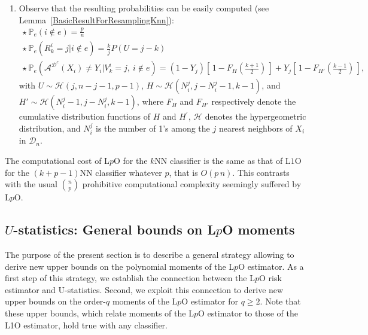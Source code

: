 \documentclass[twoside,11pt]{article}
\numberwithin{equation}{section}
\newcommand{\gp}[1]{\left(#1\right)}
\newcommand{\1}{\mathds{1}}%
\newcommand{\paren}[1]{\left( #1 \right)}
\newcommand{\croch}[1]{\left[\, #1 \,\right]}
\renewcommand{\P}{\mathbb{P}}
\newcommand{\D}{\mathcal{D}}
\newcommand{\De}{\mathcal{D}^e}
\newcommand{\A}{\mathcal{A}}
\numberwithin{equation}{section}
\theoremstyle{plain}
\begin{document}
\begin{enumerate}
\item Observe that the resulting probabilities can be easily computed (see Lemma~\ref{BasicResultForResamplingKnn}):
\begin{equation*}
\begin{array}{l}
\star \ \P_e(i \notin e) = \frac{p}{n}\\
\star \ \P_e(R_k^i=j| i \notin e) = \frac{k}{j}P\left(U=j-k\right)   \\
\star \ \P_e(\A^{\De}\gp{X_i} \neq Y_i| V_k^i=j, \ i \notin e) =
(1-Y_j) \croch{1-F_H\left(\frac{k+1}{2}\right) } +
Y_j \croch{ 1-F_{H'}\paren{ \frac{k-1}{2} } } ,
\end{array}
\end{equation*}
with $U \sim  \mathcal{H}(j,n-j-1,p-1)$, $H \sim \mathcal{H}(N_i^j,j-N_i^j-1,k-1)$, and $H' \sim \mathcal{H}(N_i^j-1,j-N_i^j,k-1)$,  {where $F_H$ and $F_{H'}$ respectively denote the cumulative distribution functions of $H$ and $H^\prime$, $\mathcal{H}$ denotes the hypergeometric distribution, and $N_i^j$ is the number of 1's among the $j$ nearest neighbors of $X_i$ in $\D_n$}.
%
\end{enumerate}
%
The computational cost of L$p$O for the $k$NN classifier is the same as that of L$1$O for the $(k+p-1)$NN classifier whatever $p$, that is $O(p\, n)$.
This contrasts with the usual ${n\choose p}$ prohibitive computational complexity seemingly suffered by L$p$O.



\subsection{$U$-statistics: General bounds on L$p$O moments}


The purpose of the present section is to describe a general strategy allowing to derive new upper bounds on the polynomial moments of the L$p$O estimator.
%
As a first step of this strategy, we establish the connection between the L$p$O risk estimator and U-statistics.
%
Second, we exploit this connection to derive new upper bounds on the order-$q$ moments of the L$p$O estimator for $q\geq2$. Note that these upper bounds, which relate moments of the L$p$O estimator to those of the L1O estimator, hold true with any classifier.
\end{document}
